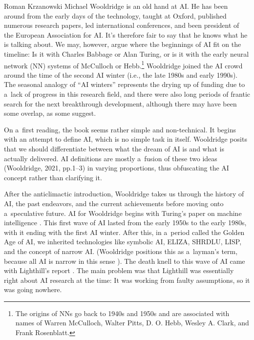 \begin{newrevengenv}{Roman Krzanowski}
Michael Wooldridge is an old hand at AI. He has been around from the early days of the technology, taught at Oxford, published numerous research papers, led international conferences, and been president of the European Association for AI. It’s therefore fair to say that he knows what he is talking about. We may, however, argue where the beginnings of AI fit on the timeline: Is it with Charles Babbage or Alan Turing, or is it with the early neural network (NN) systems of McCulloch or Hebb.\footnote{The origins of NNs go back to 1940s and 1950s and are associated with names of Warren McCulloch, Walter Pitts, D. O. Hebb, Wesley A. Clark, and Frank Rosenblatt.} Wooldridge joined the AI crowd around the time of the second AI winter (i.e., the late 1980s and early 1990s). The seasonal analogy of ``AI winters'' represents the drying up of funding due to a~lack of progress in this research field, and there were also long periods of frantic search for the next breakthrough development, although there may have been some overlap, as some suggest.

On a~first reading, the book seems rather simple and non-technical. It begins with an attempt to define AI, which is no simple task in itself. Wooldridge posits that we should differentiate between what the dream of AI is and what is actually delivered. AI definitions are mostly a~fusion of these two ideas (Wooldridge, 2021, pp.1–3) in varying proportions, thus obfuscating the AI concept rather than clarifying it.

After the anticlimactic introduction, Wooldridge takes us through the history of AI, the past endeavors, and the current achievements before moving onto a~speculative future. AI for Wooldridge begins with Turing’s paper on machine intelligence
\parencite{turing_computing_1950}.
This first wave of AI lasted from the early 1950s to the early 1980s, with it ending with the first AI winter. After this, in a~period called the Golden Age of AI, we inherited technologies like symbolic AI, ELIZA, SHRDLU, LISP, and the concept of narrow AI. (Wooldridge positions this as a~layman’s term, because all AI is narrow in this sense
\parencite[][p.42]{wooldridge_road_2021}%
). The death knell to this wave of AI came with Lighthill’s report
\parencite{lighthill_artificial_1973}.
The main problem was that Lighthill was essentially right about AI research at the time: It was working from faulty assumptions, so it was going nowhere.


\end{newrevengenv}
